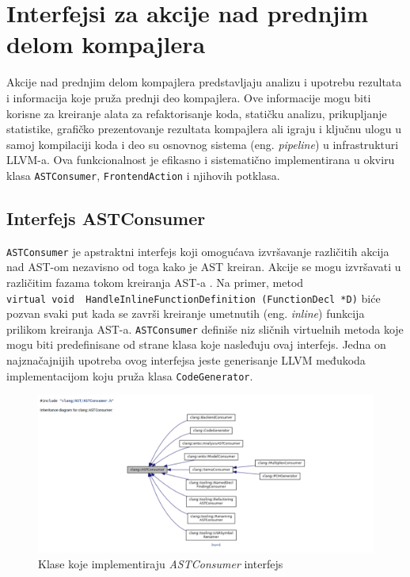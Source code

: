 \documentclass[12pt,oneside]{memoir}
\begin{document}
\section{Interfejsi za akcije nad prednjim delom kompajlera}

Akcije nad prednjim delom kompajlera predstavljaju analizu i upotrebu rezultata i informacija koje pru\v{z}a prednji deo kompajlera. Ove informacije mogu biti korisne za kreiranje alata za refaktorisanje koda, stati\v{c}ku analizu, prikupljanje statistike, grafi\v{c}ko prezentovanje rezultata kompajlera ali igraju i klju\v{c}nu ulogu u samoj kompilaciji koda i deo su osnovnog sistema (eng. \textit{pipeline}) u infrastrukturi LLVM-a.
Ova funkcionalnost je efikasno i sistemati\v{c}no implementirana u okviru klasa \lstinline{ASTConsumer}, \lstinline{FrontendAction} i njihovih potklasa.

\subsection{Interfejs ASTConsumer}
\lstinline{ASTConsumer} je apstraktni interfejs koji omogu\'{c}ava izvr\v{s}avanje razli\v{c}itih akcija nad AST-om nezavisno od toga kako je AST kreiran.
Akcije se mogu izvr\v{s}avati u razli\v{c}itim fazama tokom kreiranja AST-a \cite{ASTToolTutorial}. Na primer, metod \\ \lstinline{virtual void  HandleInlineFunctionDefinition (FunctionDecl *D)} bi\'{c}e pozvan svaki put kada se zavr\v{s}i kreiranje umetnutih (eng. \textit{inline}) funkcija prilikom kreiranja AST-a. \lstinline{ASTConsumer} defini\v{s}e niz sli\v{c}nih virtuelnih metoda koje mogu biti predefinisane od strane klasa koje nasleđuju ovaj interfejs. Jedna on najzna\v{c}ajnijih upotreba ovog interfejsa jeste generisanje LLVM međukoda implementacijom koju pru\v{z}a klasa \lstinline{CodeGenerator}. 

\begin{figure}[!h]
\begin{center}
\includegraphics[scale=0.3]{ASTConsumer2.png}
\end{center}
\caption{Klase koje implementiraju \textit{ASTConsumer} interfejs}
\label{fig:exploded}
\end{figure}
\end{document}
